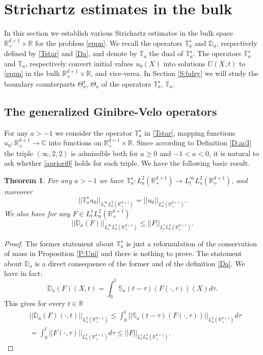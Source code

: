 \documentclass[11pt,letter]{amsart}
\def \RN {\mathbb{R}_+^{d+1}}
\def \R {\mathbb{R}}
\numberwithin{equation}{section}
\newcommand{\C}{\mathbb{C}}
\newtheorem{theorem}{Theorem}[section]
\numberwithin{equation}{section}
\begin{document}




\section{Strichartz estimates in the bulk}\label{S:stri}

In this section we establish various Strichartz estimates in the bulk space $\RN\times \R$ for the  problem \eqref{eppn}. We recall the  operators $\mathbb T_a^\star$ and $\mathbb D_a$, respectively defined by \eqref{Tstar} and \eqref{Da}, and denote by $\mathbb T_a$ the dual of $\mathbb T^\star_a$. The operators $\mathbb T_a^\star$ and $\mathbb T_a$, respectively convert initial values $u_0(X)$ into solutions $U(X,t)$ to \eqref{eppn} in the bulk $\RN\times \R$, and vice-versa. In Section \ref{S:bdry} we will study the boundary counterparts $\Theta_a^\star$, $\Theta_a$ of the operators $\mathbb T_a^\star$, $\mathbb T_a$.

\subsection{The generalized Ginibre-Velo operators}  

 For any $a>-1$ we consider the operator $\mathbb T_a^\star$ in \eqref{Tstar}, mapping functions $u_0:\RN\to \C$ into functions on  $\RN\times\R$.
Since according to Definition \ref{D:ac3} the triple $(\infty,2,2)$ is admissible both for $a\ge 0$ and $-1<a<0$, it is natural to ask whether \eqref{apriori0} holds for such triple. We have the following basic result.   
 
\begin{theorem}\label{T:Unistar}
For any $a>-1$ we have  $\mathbb T^\star_a: L^2_a(\RN)\to L^\infty_t L^2_a(\RN)$, and moreover
\[
||\mathbb T^\star_a u_0||_{L^\infty_t L^2_a(\RN)} = ||u_0||_{L^2_a(\RN)}.
\]
We also have for any $F\in L^1_t L^2_a(\RN)$
\[
||\mathbb D_a(F)||_{L^\infty_t L^2_a(\RN)} \le ||F||_{L^1_t L^2_a(\RN)}.
\]
\end{theorem}

\begin{proof}
The former statement about $\mathbb T^\star_a$ is just a reformulation of the conservation of mass in Proposition \ref{P:Uni} and there is nothing to prove. The statement about $\mathbb D_a$ is a direct consequence of the former and of the definition \eqref{Da}. We have in fact:
\[
\mathbb D_a(F)(X,t) = \int_0^t \mathbb S_a(t-\tau)(F(\cdot,\tau))(X) d\tau.
\]
This gives for every $t\in \R$
\begin{align*}
& ||\mathbb D_a(F)(\cdot,t)||_{L^2_a(\RN)}  \le \int_0^t ||\mathbb S_a(t-\tau)(F(\cdot,\tau))||_{L^2_a(\RN)} d\tau
\\
& = \int_0^t ||F(\cdot,\tau)||_{L^2_a(\RN)} d\tau \le ||F||_{L^1_t L^2_a(\RN)}.
\end{align*}


\end{proof}
\end{document}
